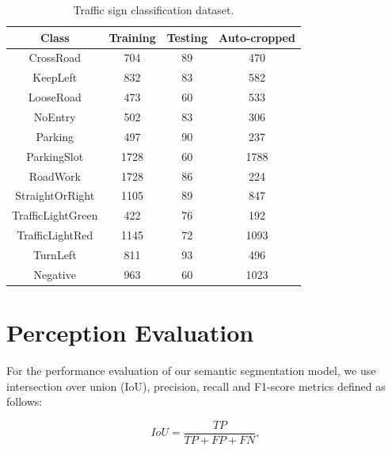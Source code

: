 \begin{table}[h]
  \begin{center}
    \caption{Traffic sign classification dataset.}
    \label{table:classification-dataset}
    \begin{tabular}{|c|c|c|c|}
      \hline
      \textbf{Class}    & \textbf{Training} & \textbf{Testing} & \textbf{Auto-cropped} \\
      \hline
      CrossRoad         & 704               & 89               & 470 \\ 
      \hline
      KeepLeft          & 832               & 83               & 582 \\ 
      \hline
      LooseRoad         & 473               & 60               & 533\\ 
      \hline
      NoEntry           & 502               & 83               & 306 \\ 
      \hline
      Parking           & 497               & 90               & 237 \\ 
      \hline
      ParkingSlot       & 1728              & 60               & 1788 \\ 
      \hline
      RoadWork          & 1728              & 86               & 224 \\ 
      \hline
      StraightOrRight   & 1105              & 89               & 847 \\ 
      \hline
      TrafficLightGreen & 422               & 76               & 192 \\ 
      \hline
      TrafficLightRed   & 1145              & 72               & 1093 \\ 
      \hline
      TurnLeft          & 811               & 93               & 496 \\
      \hline
      Negative          & 963               & 60               & 1023 \\
      \hline
    \end{tabular}
  \end{center}
\end{table}

\section{Perception Evaluation}
For the performance evaluation of our semantic segmentation model, we use
intersection over union (IoU), precision, recall and F1-score metrics defined
as follows:

\begin{equation}
  IoU = \frac{TP}{TP + FP + FN},
  \label{eq:iou}
\end{equation}

